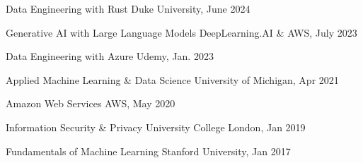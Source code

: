 
\begin{cventries}

	
	\vspace{-0.2cm}
    \cventry
    {}
    {Data Engineering with Rust}
    {Duke University, June 2024} %
    {} %
    {}

  	\vspace{-1cm}
    \cventry
    {}
    {Generative AI with Large Language Models}
    {DeepLearning.AI \& AWS, July 2023} %
    {} %
    {}
    
    \vspace{-1cm}
    \cventry
    {}
    {Data Engineering with Azure}
    {Udemy, Jan. 2023}
    {}
    {}
    
    \vspace{-1cm}
    \cventry
    {}
    {Applied Machine Learning \& Data Science}
    {University of Michigan, Apr 2021}
    {}
    {}
    
    \vspace{-1cm}
    \cventry
    {}
    {Amazon Web Services}
    {AWS, May 2020}
    {}
    {}
    
    \vspace{-1cm}
    \cventry
    {}
    {Information Security \& Privacy}
    {University College London, Jan 2019}
    {}
    {}
    
    \vspace{-1cm}
    \cventry
    {}
    {Fundamentals of Machine Learning}
    {Stanford University, Jan 2017}
    {}
    {}
	
	\vspace{-1cm}
\end{cventries}
